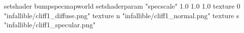 setshader bumpspecmapworld
setshaderparam "specscale" 1.0 1.0 1.0
   texture 0 "infallible/cliff1_diffuse.png"
   texture n "infallible/cliff1_normal.png"
   texture s "infallible/cliff1_specular.png"